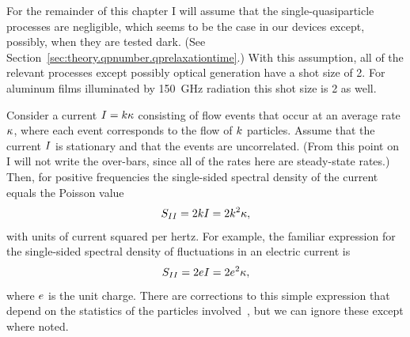 For the remainder of this chapter I will assume that the single-quasiparticle processes are negligible, which seems to be the case in our devices except, possibly, when they are tested dark.
(See Section~\ref{sec:theory.qpnumber.qprelaxationtime}.) 
With this assumption, all of the relevant processes except possibly optical generation have a shot size of 2.
For aluminum films illuminated by \SI{150}{GHz} radiation this shot size is 2 as well.

Consider a current $I = k \kappa$ consisting of flow events that occur at an average rate $\kappa$, where each event corresponds to the flow of $k$ particles.
Assume that the current $I$ is stationary and that the events are uncorrelated.
(From this point on I will not write the over-bars, since all of the rates here are steady-state rates.)
Then, for positive frequencies the single-sided spectral density of the current equals the Poisson value
\begin{equation}
S_{I I}
  =
  2 k I = 2 k^2 \kappa,
\end{equation}
with units of current squared per hertz.
For example, the familiar expression for the single-sided spectral density of fluctuations in an electric current is
\begin{equation}
S_{I I}
  =
  2 e I
  =
  2 e^2 \kappa,
\end{equation}
where $e$ is the unit charge.
There are corrections to this simple expression that depend on the statistics of the particles involved~\autocite{Blanter2000PR}, but we can ignore these except where noted.

